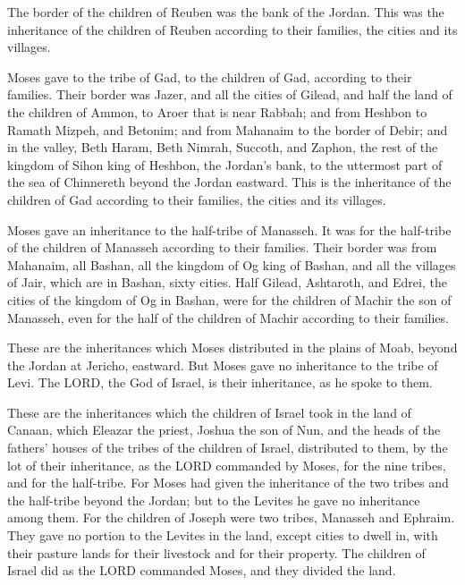 \myverse{}The border of the children of Reuben was the bank of the Jordan.
This was the inheritance of the children of Reuben according to their families, the cities and its villages.

\myverse{}Moses gave to the tribe of Gad, to the children of Gad, according
to their families.
\myverse{}Their border was Jazer, and all the cities of Gilead, and half the land of
the children of Ammon, to Aroer that is near Rabbah;
\myverse{}and from Heshbon to Ramath Mizpeh, and Betonim; and from Mahanaim to the
border of Debir;
\myverse{}and in the valley, Beth Haram, Beth Nimrah, Succoth, and Zaphon, the rest
of the kingdom of Sihon king of Heshbon, the Jordan’s bank, to the uttermost part of the sea of Chinnereth
beyond the Jordan eastward.
\myverse{}This is the inheritance of the children of Gad according to their families,
the cities and its villages.

\myverse{}Moses gave an inheritance to the half-tribe of Manasseh. It
was for the half-tribe of the children of Manasseh according to their families.
\myverse{}Their border was from Mahanaim, all Bashan, all the kingdom of Og king of
Bashan, and all the villages of Jair, which are in Bashan, sixty cities.
\myverse{}Half Gilead, Ashtaroth, and Edrei, the cities of the kingdom of Og in Bashan,
were for the children of Machir the son of Manasseh, even for the half of the children of Machir according
to their families.

\myverse{}These are the inheritances which Moses distributed in the plains
of Moab, beyond the Jordan at Jericho, eastward.
\myverse{}But Moses gave no inheritance to the tribe of Levi. The LORD, the God of
Israel, is their inheritance, as he spoke to them.


\mychapter{} \myverse*{}These are the inheritances which the children of Israel took in
the land of Canaan, which Eleazar the priest, Joshua the son of Nun, and the heads of the fathers’ houses
of the tribes of the children of Israel, distributed to them,
\myverse{}by the lot of their inheritance, as the LORD commanded by Moses, for the nine
tribes, and for the half-tribe.
\myverse{}For Moses had given the inheritance of the two tribes and the half-tribe beyond
the Jordan; but to the Levites he gave no inheritance among them.
\myverse{}For the children of Joseph were two tribes, Manasseh and Ephraim. They gave
no portion to the Levites in the land, except cities to dwell in, with their pasture lands for their livestock
and for their property.
\myverse{}The children of Israel did as the LORD commanded Moses, and they divided the
land.

